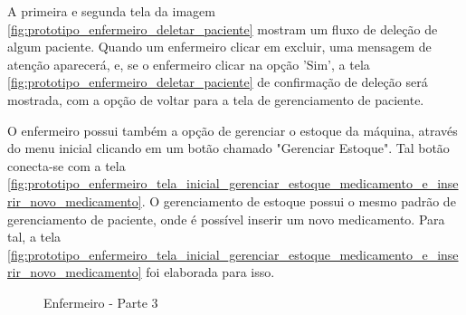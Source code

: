 A primeira e segunda tela da imagem \ref{fig:prototipo_enfermeiro_deletar_paciente} mostram um fluxo de deleção de algum paciente. Quando um enfermeiro clicar em excluir, uma mensagem de atenção aparecerá, e, se o enfermeiro clicar na opção 'Sim', a tela \ref{fig:prototipo_enfermeiro_deletar_paciente} de confirmação de deleção será mostrada, com a opção de voltar para a tela de gerenciamento de paciente.

O enfermeiro possui também a opção de gerenciar o estoque da máquina, através do menu inicial clicando em um botão chamado "Gerenciar Estoque". Tal botão conecta-se com a tela \ref{fig:prototipo_enfermeiro_tela_inicial_gerenciar_estoque_medicamento_e_inserir_novo_medicamento}. O gerenciamento de estoque possui o mesmo padrão de gerenciamento de paciente, onde é possível inserir um novo medicamento. Para tal, a tela \ref{fig:prototipo_enfermeiro_tela_inicial_gerenciar_estoque_medicamento_e_inserir_novo_medicamento} foi elaborada para isso.

\begin{figure}[H]
    \centering
\end{figure}

\begin{figure}[H]
    \centering    
    \caption{Enfermeiro - Parte 3}
\end{figure}

